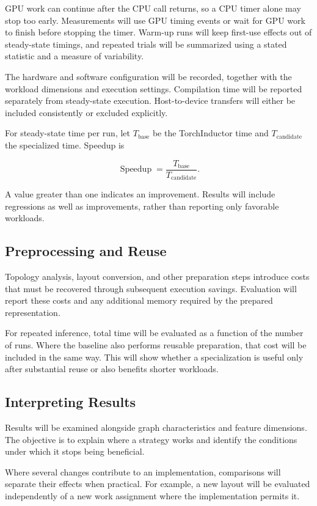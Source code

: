 GPU work can continue after the CPU call returns, so a CPU timer alone may stop too early. Measurements will use GPU timing events or wait for GPU work to finish before stopping the timer. Warm-up runs will keep first-use effects out of steady-state timings, and repeated trials will be summarized using a stated statistic and a measure of variability.

The hardware and software configuration will be recorded, together with the workload dimensions and execution settings. Compilation time will be reported separately from steady-state execution. Host-to-device transfers will either be included consistently or excluded explicitly.

For steady-state time per run, let $T_{\mathrm{base}}$ be the TorchInductor time and $T_{\mathrm{candidate}}$ the specialized time. Speedup is

\[
  \operatorname{Speedup}=\frac{T_{\mathrm{base}}}{T_{\mathrm{candidate}}}.
\]

A value greater than one indicates an improvement. Results will include regressions as well as improvements, rather than reporting only favorable workloads.

\subsection{Preprocessing and Reuse}

Topology analysis, layout conversion, and other preparation steps introduce costs that must be recovered through subsequent execution savings. Evaluation will report these costs and any additional memory required by the prepared representation.

For repeated inference, total time will be evaluated as a function of the number of runs. Where the baseline also performs reusable preparation, that cost will be included in the same way. This will show whether a specialization is useful only after substantial reuse or also benefits shorter workloads.

\subsection{Interpreting Results}

Results will be examined alongside graph characteristics and feature dimensions. The objective is to explain where a strategy works and identify the conditions under which it stops being beneficial.

Where several changes contribute to an implementation, comparisons will separate their effects when practical. For example, a new layout will be evaluated independently of a new work assignment where the implementation permits it.
